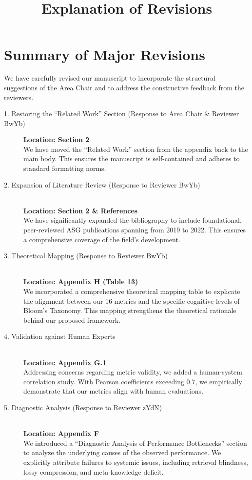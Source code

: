 \documentclass[11pt, a4paper]{article}
\title{\textbf{Explanation of Revisions}}
\date{}
\begin{document}
\maketitle

\section{Summary of Major Revisions}
We have carefully revised our manuscript to incorporate the structural suggestions of the Area Chair and to address the constructive feedback from the reviewers.

\begin{description}
\item[1. Restoring the ``Related Work'' Section (Response to Area Chair \& Reviewer BwYb)] \hfill 
\textbf{Location: Section 2} \\
We have moved the ``Related Work'' section from the appendix back to the main body. This ensures the manuscript is self-contained and adheres to standard formatting norms.

\item[2. Expansion of Literature Review (Response to Reviewer BwYb)] \hfill \\
\textbf{Location: Section 2 \& References} \\
We have significantly expanded the bibliography to include foundational, peer-reviewed ASG publications spanning from 2019 to 2022. This ensures a comprehensive coverage of the field's development.

\item[3. Theoretical Mapping (Response to Reviewer BwYb)] \hfill \\
\textbf{Location: Appendix H (Table 13)} \\
We incorporated a comprehensive theoretical mapping table to explicate the alignment between our 16 metrics and the specific cognitive levels of Bloom's Taxonomy. This mapping strengthens the theoretical rationale behind our proposed framework.

\item[4. Validation against Human Experts] \hfill \\
\textbf{Location: Appendix G.1} \\
Addressing concerns regarding metric validity, we added a human-system correlation study. With Pearson coefficients exceeding 0.7, we empirically demonstrate that our metrics align with human evaluations.

\item[5. Diagnostic Analysis (Response to Reviewer zYdN)] \hfill \\
\textbf{Location: Appendix F} \\
We introduced a ``Diagnostic Analysis of Performance Bottlenecks'' section to analyze the underlying causes of the observed performance. We explicitly attribute failures to systemic issues, including retrieval blindness, lossy compression, and meta-knowledge deficit.

\end{description}
\end{document}
